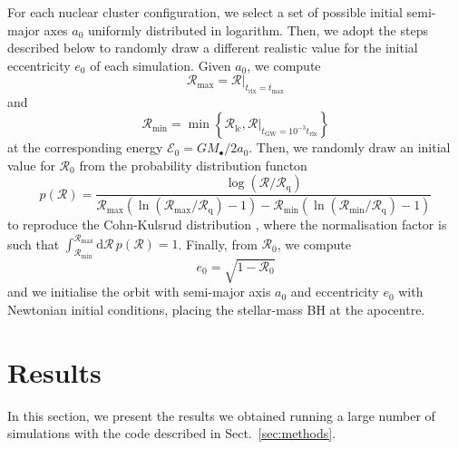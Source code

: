 \documentclass[desactivate]{aa}
\begin{document}
        For each nuclear cluster configuration, we select a set of possible initial semi-major axes $a_0$ uniformly distributed in logarithm. Then, we adopt the steps described below to randomly draw a different realistic value for the initial eccentricity $e_0$ of each simulation. Given $a_0$, we compute 
        \begin{equation}
            \mathcal{R}_\mathrm{max} = \left.\mathcal{R}\right\rvert_{t_\mathrm{rlx} = t_\mathrm{max}}
        \end{equation}
        and
        \begin{equation}
            \mathcal{R}_\mathrm{min} = \min\left\{\mathcal{R}_\mathrm{lc}, \left.\mathcal{R}\right\rvert_{t_\mathrm{GW} = 10^{-3} t_\mathrm{rlx}}\right\}
        \end{equation}
        at the corresponding energy $\mathcal{E}_0 = G M_\bullet / 2 a_0$. Then, we randomly draw an initial value for $\mathcal{R}_0$ from the probability distribution functon
        \begin{equation}
            p(\mathcal{R}) = \frac{\log \left( \mathcal{R}/\mathcal{R}_\mathrm{q} \right)}{\mathcal{R}_\mathrm{max}\left( \ln\left(\mathcal{R}_\mathrm{max}/\mathcal{R}_\mathrm{q}\right)-1\right) - \mathcal{R}_\mathrm{min}\left( \ln\left(\mathcal{R}_\mathrm{min}/\mathcal{R}_\mathrm{q}\right)-1\right)}
        \end{equation}
        to reproduce the Cohn-Kulsrud distribution \citep[][also see Sect.\ \ref{sec:losscone_diff}]{1978ApJ...226.1087C}, where the normalisation factor is such that $\int_{\mathcal{R}_\mathrm{min}}^{\mathcal{R}_\mathrm{max}} \mathrm{d}\mathcal{R}\, p(\mathcal{R}) =1$. Finally, from $\mathcal{R}_0$, we compute
        \begin{equation}
            e_0 = \sqrt{1-\mathcal{R}_0}
        \end{equation}
        and we initialise the orbit with semi-major axis $a_0$ and eccentricity $e_0$ with Newtonian initial conditions, placing the stellar-mass BH at the apocentre.


\section{Results}\label{sec:results}

    In this section, we present the results we obtained running a large number of simulations with the code described in Sect.\ \ref{sec:methods}.   
\end{document}
